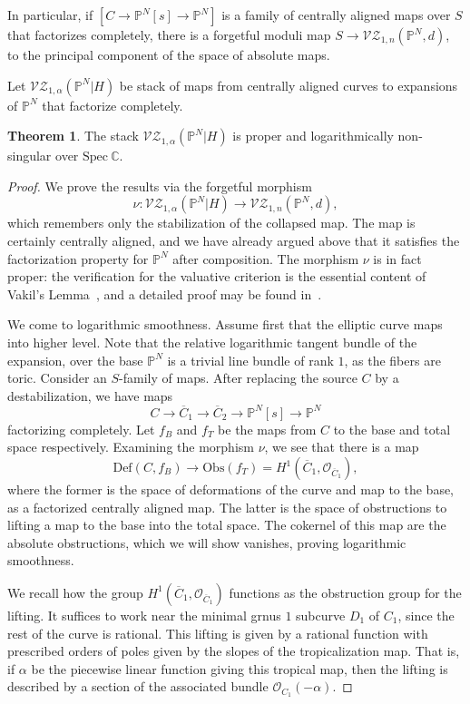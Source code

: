 \documentclass[11pt]{amsart}
\renewcommand{\to}{\rightarrow}
\theoremstyle{definition}
\newtheorem{thm}{Theorem}[section]
\theoremstyle{definition}
\begin{document}
In particular, if $[C\to \mathbb P^N[s]\to \mathbb P^N]$ is a family of centrally aligned maps over $S$ that factorizes completely, there is a forgetful moduli map $S\to \mathcal{VZ}_{1,n}(\mathbb P^N,d)$, to the principal component of the space of absolute maps.

Let $\mathcal{VZ}_{1,\alpha}(\mathbb P^N|H)$ be stack of maps from centrally aligned curves to expansions of $\mathbb P^N$ that factorize completely.

\begin{thm}\label{thm: log-smoothness}
The stack $\mathcal{VZ}_{1,\alpha}(\mathbb P^N|H)$ is proper and logarithmically non-singular over $\mathrm{Spec} \ \mathbb C$. 
\end{thm}

\begin{proof}
We prove the results via the forgetful morphism
$$
\nu: \mathcal{VZ}_{1,\alpha}(\mathbb P^N|H)\to \mathcal{VZ}_{1,n}(\mathbb P^N,d),
$$
which remembers only the stabilization of the collapsed map. The map is certainly centrally aligned, and we have already argued above that it satisfies the factorization property for $\mathbb P^N$ after composition. The morphism $\nu$ is in fact proper: the verification for the valuative criterion is the essential content of Vakil's Lemma~\cite[Lemma~5.9]{Vak}, and a detailed proof may be found in~\cite[Theorem~4.3]{RSPW}.

We come to logarithmic smoothness. Assume first that the elliptic curve maps into higher level. Note that the relative logarithmic tangent bundle of the expansion, over the base $\mathbb P^N$ is a trivial line bundle of rank $1$, as the fibers are toric. Consider an $S$-family of maps. After replacing the source $C$ by a destabilization, we have maps
\[
C\to \overline{C}_1\to\overline{C}_2\to \mathbb P^N[s]\to \mathbb P^N
\]
factorizing completely. Let $f_B$ and $f_T$ be the maps from $C$ to the base and total space respectively. Examining the morphism $\nu$, we see that there is a map
\[
\mathrm{Def}(C,f_B)\to \mathrm{Obs}(f_T) = H^1(\overline{C}_1,\mathcal O_{\overline{C}_1}),
\]
where the former is the space of deformations of the curve and map to the base, as a factorized centrally aligned map. The latter is the space of obstructions to lifting a map to the base into the total space. The cokernel of this map are the absolute obstructions, which we will show vanishes, proving logarithmic smoothness.

We recall how the group $H^1(\overline{C}_1,\mathcal O_{\overline{C}_1})$ functions as the obstruction group for the lifting. It suffices to work near the minimal grnus $1$ subcurve $D_1$ of $C_1$, since the rest of the curve is rational. This lifting is given by a rational function with prescribed orders of poles given by the slopes of the tropicalization map. That is, if $\alpha$ be the piecewise linear function giving this tropical map, then the lifting is described by a section of the associated bundle $\mathcal O_{C_1}(-\alpha)$.


\end{proof}
\end{document}
